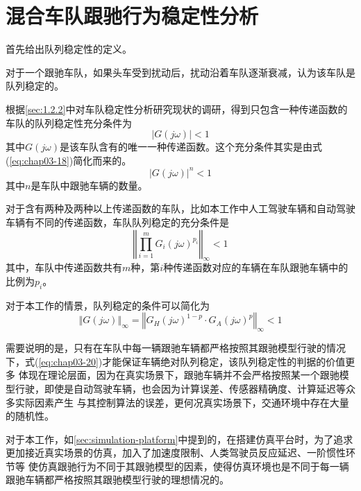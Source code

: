 \section{混合车队跟驰行为稳定性分析}
\label{sec:3.3}

首先给出队列稳定性的定义。 \\

\begin{definition}
  对于一个跟驰车队，如果头车受到扰动后，扰动沿着车队逐渐衰减，认为该车队是队列稳定的。
  \label{def:chap03-def1}
\end{definition}

根据\ref{sec:1.2.2}中对车队稳定性分析研究现状的调研，得到只包含一种传递函数的车队的队列稳定性充分条件为
\begin{equation}
  | G(j\omega) | < 1
  \label{eq:chap03-17}
\end{equation}
其中$G(j\omega)$是该车队含有的唯一一种传递函数。这个充分条件其实是由式(\ref{eq:chap03-18})简化而来的。
\begin{equation}
  | G(j\omega) |^n < 1
  \label{eq:chap03-18}
\end{equation}
其中$n$是车队中跟驰车辆的数量。

对于含有两种及两种以上传递函数的车队，比如本工作中人工驾驶车辆和自动驾驶车辆有不同的传递函数，车队队列稳定的充分条件是
\begin{equation}
  \left\Vert \prod_{i=1}^{m}{G_i(j\omega)^{p_i}} \right\Vert_{\infty} < 1
  \label{eq:chap03-19}
\end{equation}
其中，车队中传递函数共有$m$种，第$i$种传递函数对应的车辆在车队跟驰车辆中的比例为$p_i$。

对于本工作的情景，队列稳定的条件可以简化为
\begin{equation}
  \left\Vert G(j\omega) \right\Vert_{\infty} = \left\Vert G_H(j\omega)^{1-p} \cdot G_A(j\omega)^p \right\Vert_{\infty} < 1
  \label{eq:chap03-20}
\end{equation}

需要说明的是，只有在车队中每一辆跟驰车辆都严格按照其跟驰模型行驶的情况下，式(\ref{eq:chap03-20})才能保证车辆绝对队列稳定，该队列稳定性的判据的价值更多
体现在理论层面，因为在真实场景下，跟驰车辆并不会严格按照某一个跟驰模型行驶，即使是自动驾驶车辆，也会因为计算误差、传感器精确度、计算延迟等众多实际因素产生
与其控制算法的误差，更何况真实场景下，交通环境中存在大量的随机性。

对于本工作，如\ref{sec:simulation-platform}中提到的，在搭建仿真平台时，为了追求更加接近真实场景的仿真，加入了加速度限制、人类驾驶员反应延迟、一阶惯性环节等
使仿真跟驰行为不同于其跟驰模型的因素，使得仿真环境也是不同于每一辆跟驰车辆都严格按照其跟驰模型行驶的理想情况的。

